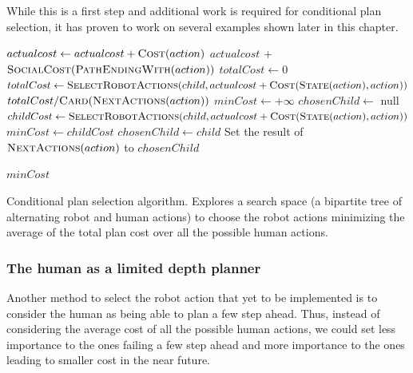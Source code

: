 \documentclass[a4paper,11pt,twoside]{StyleThese}
\begin{document}
While this is a first step and additional work is required for conditional plan selection, it has proven to work on several examples shown later in this chapter.

\begin{algorithm}[H]
\begin{algorithmic}[1]
 
	\State $actualcost \leftarrow actualcost + \textsc{Cost}(action)$
	\State \Return $actualcost$ + $\textsc{SocialCost}(\textsc{PathEndingWith}(action))$
\EndIf
{} 
	\State $totalCost \leftarrow 0$
		\State $totalCost \leftarrow \textsc{SelectRobotActions}(child, actualcost + \textsc{Cost}(\textsc{State}(action), action))$
	\EndFor
	\State \Return $totalCost / \textsc{Card}(\textsc{NextActions}(action))$
\Else {}
	\State $minCost \leftarrow +\infty$
	\State $chosenChild \leftarrow$ null
		\State $childCost \leftarrow \textsc{SelectRobotActions}(child, actualcost + \textsc{Cost}(\textsc{State}(action), action))$
			\State $minCost \leftarrow childCost$
			\State $chosenChild \leftarrow child$
		\EndIf
	\EndFor
	\State Set the result of $\textsc{NextActions}(action)$ to $chosenChild$
	
	\State \Return $minCost$	
\EndIf
\EndFunction
	
\end{algorithmic}
 \caption{Conditional plan selection algorithm. Explores a search space (a bipartite tree of alternating robot and human actions) to choose the robot actions minimizing the average of the total plan cost over all the possible human actions.}
 \label{alg:minaverage}
\end{algorithm}

\subsubsection{The human as a limited depth planner}
Another method to select the robot action that yet to be implemented is to consider the human as being able to plan a few step ahead. Thus, instead of considering the average cost of all the possible human actions, we could set less importance to the ones failing a few step ahead and more importance to the ones leading to smaller cost in the near future.
\end{document}
